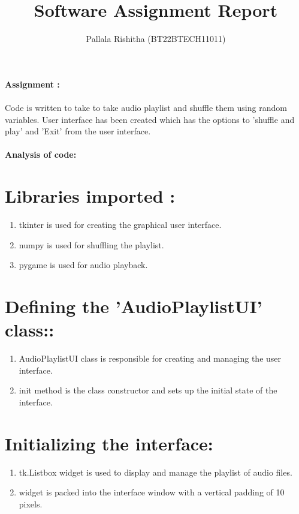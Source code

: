 \documentclass[12pt,onecolumn,notitlepage]{article}
\title{Software Assignment Report}
\author{Pallala Rishitha (BT22BTECH11011)}
\date{}
\begin{document}
\maketitle
\textbf{\LARGE{Assignment :}}\\\\Code is written to take to take audio playlist and shuffle them using random variables. User interface has been created which has the options to 'shuffle and play' and 'Exit' from the user interface.\\\\
\textbf{\LARGE{Analysis of code:}}

   \section*{Libraries imported :}
\begin{enumerate}
  \setlength\itemsep{0pt} %
  \item     tkinter is used for creating the graphical user interface.
    \item numpy is used for shuffling the playlist.
    \item pygame is used for audio playback.
\end{enumerate} 
   \section*{Defining the 'AudioPlaylistUI' class::}
\begin{enumerate}
  \setlength\itemsep{0pt}
  \item AudioPlaylistUI class is responsible for creating and managing the user interface.
  \item init method is the class constructor and sets up the initial state of the interface.
\end{enumerate} 
 
\section*{Initializing the interface:}
\begin{enumerate}
  \setlength\itemsep{0pt}
      \item  tk.Listbox widget is used to display and manage the playlist of audio files.
    \item  widget is packed into the interface window with a vertical padding of 10 pixels.
\end{enumerate} 
 
\end{document}
